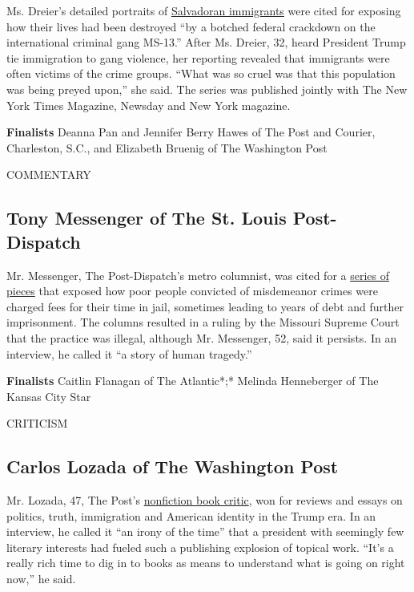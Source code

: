 Ms. Dreier's detailed portraits of
\href{https://www.propublica.org/series/ms-13-on-long-island}{Salvadoran
immigrants} were cited for exposing how their lives had been destroyed
``by a botched federal crackdown on the international criminal gang
MS-13.'' After Ms. Dreier, 32, heard President Trump tie immigration to
gang violence, her reporting revealed that immigrants were often victims
of the crime groups. ``What was so cruel was that this population was
being preyed upon,'' she said. The series was published jointly with The
New York Times Magazine, Newsday and New York magazine.

\textbf{Finalists} Deanna Pan and Jennifer Berry Hawes of The Post and
Courier, Charleston, S.C., and Elizabeth Bruenig of The Washington Post

COMMENTARY

\hypertarget{tony-messenger-of-the-st-louis-post-dispatch}{%
\subsection{Tony Messenger of The St. Louis
Post-Dispatch}\label{tony-messenger-of-the-st-louis-post-dispatch}}

Mr. Messenger, The Post-Dispatch's metro columnist, was cited for a
\href{https://www.stltoday.com/news/local/metro/post-dispatch-columnist-tony-messenger-wins-pulitzer-prize/article_ef22909b-12a9-510c-802f-48d0a66cb16c.html}{series
of pieces} that exposed how poor people convicted of misdemeanor crimes
were charged fees for their time in jail, sometimes leading to years of
debt and further imprisonment. The columns resulted in a ruling by the
Missouri Supreme Court that the practice was illegal, although Mr.
Messenger, 52, said it persists. In an interview, he called it ``a story
of human tragedy.''

\textbf{Finalists} Caitlin Flanagan of The Atlantic*;* Melinda
Henneberger of The Kansas City Star

CRITICISM

\hypertarget{carlos-lozada-of-the-washington-post}{%
\subsection{Carlos Lozada of The Washington
Post}\label{carlos-lozada-of-the-washington-post}}

Mr. Lozada, 47, The Post's
\href{https://www.washingtonpost.com/people/carlos-lozada}{nonfiction
book critic}, won for reviews and essays on politics, truth, immigration
and American identity in the Trump era. In an interview, he called it
``an irony of the time'' that a president with seemingly few literary
interests had fueled such a publishing explosion of topical work. ``It's
a really rich time to dig in to books as means to understand what is
going on right now,'' he said.

